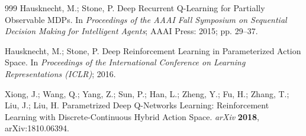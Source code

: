 \documentclass[notspecified,article,submit,moreauthors]{Definitions/mdpi}
\begin{document}
\begin{thebibliography}{999}
Hausknecht, M.; Stone, P. Deep Recurrent Q-Learning for Partially Observable MDPs. In {\em Proceedings of the AAAI Fall Symposium on Sequential Decision Making for Intelligent Agents}; AAAI Press: 2015; pp. 29--37.

Hausknecht, M.; Stone, P. Deep Reinforcement Learning in Parameterized Action Space. In {\em Proceedings of the International Conference on Learning Representations (ICLR)}; 2016.

Xiong, J.; Wang, Q.; Yang, Z.; Sun, P.; Han, L.; Zheng, Y.; Fu, H.; Zhang, T.; Liu, J.; Liu, H. Parametrized Deep Q-Networks Learning: Reinforcement Learning with Discrete-Continuous Hybrid Action Space. {\em arXiv} {\bf 2018}, arXiv:1810.06394.
\end{thebibliography}
\end{document}
